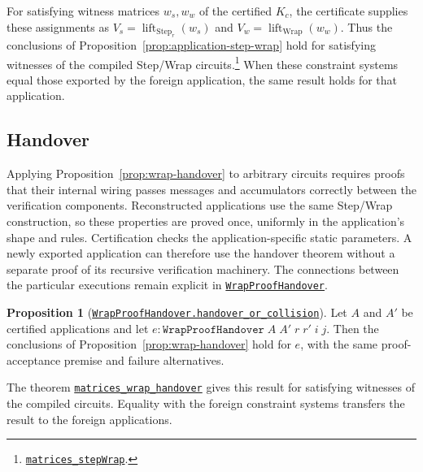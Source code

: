 \documentclass[11pt,a4paper]{article}
\newcommand{\inlinecode}[1]{\mbox{\texttt{#1}}}
\theoremstyle{definition}
\theoremstyle{insetstatement}
\newtheorem{propositiontext}[example]{Proposition}
\newenvironment{statementblock}
  {\begin{list}{}{%
    \setlength{\leftmargin}{0pt}%
    \setlength{\rightmargin}{0pt}%
    \setlength{\labelwidth}{0pt}%
    \setlength{\labelsep}{0pt}%
    \setlength{\itemindent}{0pt}%
    \setlength{\listparindent}{0pt}%
    \setlength{\topsep}{.7\baselineskip plus 2pt minus 1pt}%
    \setlength{\partopsep}{0pt}%
    \setlength{\parsep}{0pt}%
    \setlength{\itemsep}{0pt}}%
    \item\relax}
  {\end{list}}
\newenvironment{proposition}[1][]
  {\begin{statementblock}\begin{propositiontext}[{#1}]\pushQED{\qed}}
  {\popQED\end{propositiontext}\end{statementblock}}
\begin{document}
For satisfying witness matrices $w_s,w_w$ of the certified $K_c$, the
certificate supplies these assignments as
\mbox{$V_s=\operatorname{lift}_{\mathrm{Step}_r}(w_s)$} and
\mbox{$V_w=\operatorname{lift}_{\mathrm{Wrap}}(w_w)$}.
Thus the conclusions of Proposition~\ref{prop:application-step-wrap} hold
for satisfying witnesses of the compiled Step/Wrap circuits.\footnote{\href{https://github.com/l-adic/snarky/blob/main/formal/pickles/Pickles/Application/Certification.lean\#L164}{\inlinecode{matrices\_stepWrap}}.}
When these constraint systems equal those exported by the foreign
application, the same result holds for that application.

\subsection{Handover}
\label{sec:application-handover}

Applying Proposition~\ref{prop:wrap-handover} to arbitrary circuits requires
proofs that their internal wiring passes messages and accumulators correctly
between the verification components. Reconstructed applications use the same
Step/Wrap construction, so these properties are proved once, uniformly in
the application's shape and rules. Certification checks the
application-specific static parameters. A newly exported application can
therefore use the handover theorem without a separate proof of its recursive
verification machinery. The connections between the particular executions
remain explicit in
\href{https://github.com/l-adic/snarky/blob/main/formal/pickles/Pickles/Application/Handover.lean\#L94}{\inlinecode{WrapProofHandover}}.

\begin{proposition}[\href{https://github.com/l-adic/snarky/blob/main/formal/pickles/Pickles/Application/Handover.lean\#L148}{\inlinecode{WrapProofHandover.handover\_or\_collision}}]
\label{prop:application-handover}
Let $A$ and $A'$ be certified applications and let
$e:\mathtt{WrapProofHandover}\;A\;A'\;r\;r'\;i\;j$.
Then the conclusions of Proposition~\ref{prop:wrap-handover} hold for $e$,
with the same proof-acceptance premise and failure alternatives.
\end{proposition}

The theorem
\href{https://github.com/l-adic/snarky/blob/main/formal/pickles/Pickles/Application/Certification.lean\#L142}{\inlinecode{matrices\_wrap\_handover}}
gives this result for satisfying witnesses of the compiled circuits.
Equality with the foreign constraint systems transfers the result to the
foreign applications.
\end{document}
